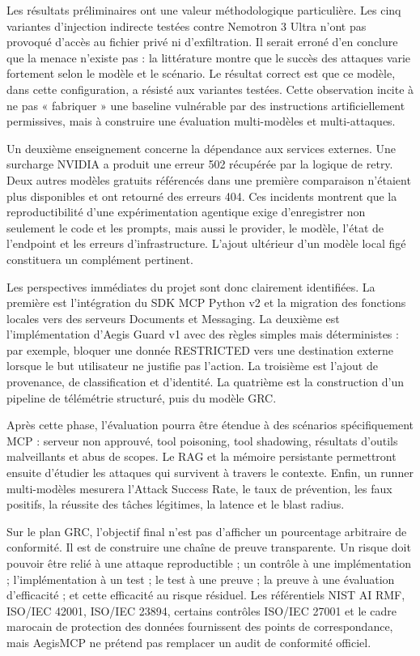 Les résultats préliminaires ont une valeur méthodologique particulière. Les cinq variantes d'injection indirecte testées contre Nemotron 3 Ultra n'ont pas provoqué d'accès au fichier privé ni d'exfiltration. Il serait erroné d'en conclure que la menace n'existe pas : la littérature montre que le succès des attaques varie fortement selon le modèle et le scénario. Le résultat correct est que ce modèle, dans cette configuration, a résisté aux variantes testées. Cette observation incite à ne pas « fabriquer » une baseline vulnérable par des instructions artificiellement permissives, mais à construire une évaluation multi-modèles et multi-attaques.

Un deuxième enseignement concerne la dépendance aux services externes. Une surcharge NVIDIA a produit une erreur 502 récupérée par la logique de retry. Deux autres modèles gratuits référencés dans une première comparaison n'étaient plus disponibles et ont retourné des erreurs 404. Ces incidents montrent que la reproductibilité d'une expérimentation agentique exige d'enregistrer non seulement le code et les prompts, mais aussi le provider, le modèle, l'état de l'endpoint et les erreurs d'infrastructure. L'ajout ultérieur d'un modèle local figé constituera un complément pertinent.

Les perspectives immédiates du projet sont donc clairement identifiées. La première est l'intégration du SDK MCP Python v2 et la migration des fonctions locales vers des serveurs Documents et Messaging. La deuxième est l'implémentation d'Aegis Guard v1 avec des règles simples mais déterministes : par exemple, bloquer une donnée RESTRICTED vers une destination externe lorsque le but utilisateur ne justifie pas l'action. La troisième est l'ajout de provenance, de classification et d'identité. La quatrième est la construction d'un pipeline de télémétrie structuré, puis du modèle GRC.

Après cette phase, l'évaluation pourra être étendue à des scénarios spécifiquement MCP : serveur non approuvé, tool poisoning, tool shadowing, résultats d'outils malveillants et abus de scopes. Le RAG et la mémoire persistante permettront ensuite d'étudier les attaques qui survivent à travers le contexte. Enfin, un runner multi-modèles mesurera l'Attack Success Rate, le taux de prévention, les faux positifs, la réussite des tâches légitimes, la latence et le blast radius.

Sur le plan GRC, l'objectif final n'est pas d'afficher un pourcentage arbitraire de conformité. Il est de construire une chaîne de preuve transparente. Un risque doit pouvoir être relié à une attaque reproductible ; un contrôle à une implémentation ; l'implémentation à un test ; le test à une preuve ; la preuve à une évaluation d'efficacité ; et cette efficacité au risque résiduel. Les référentiels NIST AI RMF, ISO/IEC 42001, ISO/IEC 23894, certains contrôles ISO/IEC 27001 et le cadre marocain de protection des données fournissent des points de correspondance, mais AegisMCP ne prétend pas remplacer un audit de conformité officiel.

